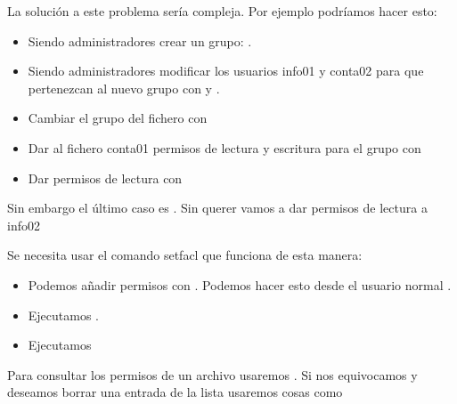 \documentclass[letterpaper,10pt,spanish]{sphinxmanual}
\begin{document}
La solución a este problema sería compleja. Por ejemplo podríamos hacer esto:
\begin{itemize}
\item {} 
Siendo administradores crear un grupo: .

\item {} 
Siendo administradores modificar los usuarios info01 y conta02 para que pertenezcan al nuevo grupo con  y  .

\item {} 
Cambiar el grupo del fichero  con 

\item {} 
Dar al fichero conta01 permisos de lectura y escritura para el grupo con 

\item {} 
Dar permisos de lectura  con 

\end{itemize}

Sin embargo el último caso es  . Sin querer vamos a dar permisos de lectura a info02 

Se necesita usar el comando setfacl que funciona de esta manera:
\begin{itemize}
\item {} 
Podemos añadir permisos con . Podemos hacer esto desde el usuario normal  .

\item {} 
Ejecutamos  .

\item {} 
Ejecutamos 

\end{itemize}

Para consultar los permisos de un archivo usaremos . Si nos equivocamos y deseamos borrar una entrada de la lista usaremos cosas como 
\end{document}
